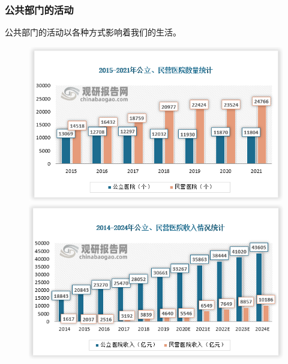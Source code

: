 \documentclass[aspectratio=169, 12pt]{beamer}
\begin{document}
\begin{frame}[plain]
    \frametitle{公共部门的活动}
    公共部门的活动以各种方式影响着我们的生活。
    \begin{figure}
        \centering
        \begin{minipage}[t]{0.5\linewidth}
            \centering
            \includegraphics[width=1.0\textwidth]{./resources/figure/medical1.png}
        \end{minipage}%
        \begin{minipage}[t]{0.5\linewidth}
            \centering
            \includegraphics[width=1.0\textwidth]{./resources/figure/medical2.png}
        \end{minipage}
    \end{figure}
\end{frame}
\end{document}
